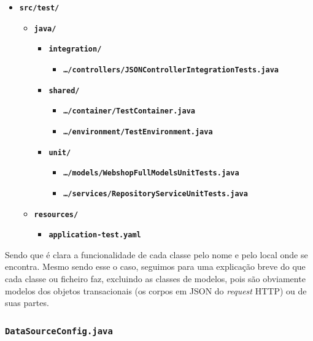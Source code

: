 \begin{itemize}
  \item \texttt{\textbf{src/test/}}\begin{itemize}
      \item \texttt{\textbf{java/}}\begin{itemize}
          \item \texttt{\textbf{integration/}}\begin{itemize}
              \item \texttt{\textbf{\ldots/controllers/JSONControllerIntegrationTests.java}}
            \end{itemize}
          \item \texttt{\textbf{shared/}}\begin{itemize}
              \item \texttt{\textbf{\ldots/container/TestContainer.java}}
              \item \texttt{\textbf{\ldots/environment/TestEnvironment.java}}
            \end{itemize}
          \item \texttt{\textbf{unit/}}\begin{itemize}
              \item \texttt{\textbf{\ldots/models/WebshopFullModelsUnitTests.java}}
              \item \texttt{\textbf{\ldots/services/RepositoryServiceUnitTests.java}}
            \end{itemize}
        \end{itemize}
      \item \texttt{\textbf{resources/}}\begin{itemize}
          \item \texttt{\textbf{application-test.yaml}}
        \end{itemize}
    \end{itemize}
\end{itemize}

Sendo que é clara a funcionalidade de cada classe pelo nome e pelo local onde se encontra. Mesmo sendo esse o caso, seguimos para uma explicação breve do que cada classe ou ficheiro faz, excluindo as classes de modelos, pois são obviamente modelos dos objetos transacionais (os corpos em JSON do \textit{request} HTTP) ou de suas partes.

\subsubsection*{\texttt{DataSourceConfig.java}}

